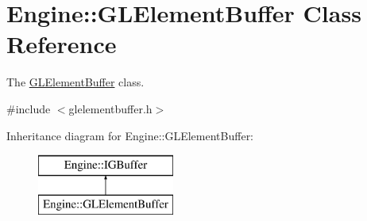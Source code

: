 \hypertarget{classEngine_1_1GLElementBuffer}{}\section{Engine\+:\+:G\+L\+Element\+Buffer Class Reference}
\label{classEngine_1_1GLElementBuffer}


The \hyperlink{classEngine_1_1GLElementBuffer}{G\+L\+Element\+Buffer} class.  




{\ttfamily \#include $<$glelementbuffer.\+h$>$}

Inheritance diagram for Engine\+:\+:G\+L\+Element\+Buffer\+:\begin{figure}[H]
\begin{center}
\leavevmode
\includegraphics[height=2.000000cm]{classEngine_1_1GLElementBuffer}
\end{center}
\end{figure}
